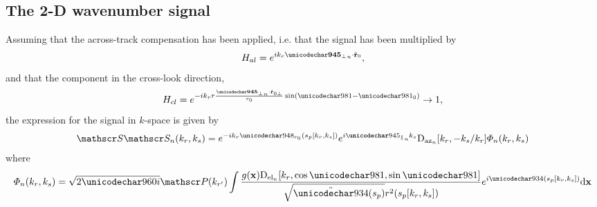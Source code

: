 \subsection{The 2-D wavenumber signal}
Assuming that the across-track compensation has been applied, i.e. that the signal has been multiplied by 
\begin{equation}
 H_{al} = \eex{\im\kr\acrosstrack\cdot\uRangeVectorParmZero},
\end{equation}
and that the component in the cross-look direction,
\begin{equation}
 H_{cl} = \eex{-\im\kr\targetrange\frac{\acrosstrack\cdot\uRangeVectorParmZeroPerp}{\targetrangez}\sin(\targetdepression-\targetdepressionz)} \rightarrow 1,
\end{equation}
the expression for the signal in $k$-space is given by
\begin{equation}
\begin{split}
 \SkSk{\channelIndex}(\kr,\kparm)=\eex{-\im\kr\rangeErrorZero(\stationaryparm[\kr,\kparm])}\eex{\im\alongtrack\kparm}\dazPattern{\channelIndex}[\kr, -\kparm/\kr]\vkern_\channelIndex(\kr, \kparm)
 \end{split}
 \label{eq:sparmft2}
\end{equation}
where
\begin{equation}
\vkern_\channelIndex(\kr, \kparm) = \sqrt{2\pi\im}\Snvelope(\krc)\int\frac{\reflectivity(\targetnoparm)\delPattern{\channelIndex}[\kr, \cos\targetdepression, \sin\targetdepression]}{\sqrt{\ddot\Phi(\stationaryparm)}\amplitude\range^2(\stationaryparm[\kr,\kparm])}\eex{\im\Phi(\stationaryparm[\kr,\kparm])}\d\targetnoparm
\end{equation}
